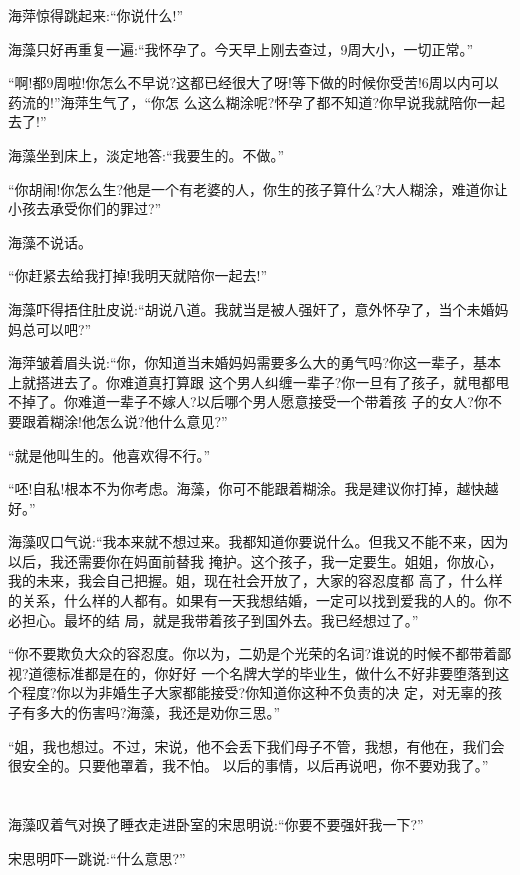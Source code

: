 \documentclass[11pt,a4paper,onecolumn]{article}
\begin{document}
海萍惊得跳起来:``你说什么!''

海藻只好再重复一遍:``我怀孕了。今天早上刚去查过，9周大小，一切正常。''

``啊!都9周啦!你怎么不早说?这都已经很大了呀!等下做的时候你受苦!6周以内可以药流的!''海萍生气了，``你怎
么这么糊涂呢?怀孕了都不知道?你早说我就陪你一起去了!''

海藻坐到床上，淡定地答:``我要生的。不做。''

``你胡闹!你怎么生?他是一个有老婆的人，你生的孩子算什么?大人糊涂，难道你让小孩去承受你们的罪过?''

海藻不说话。

``你赶紧去给我打掉!我明天就陪你一起去!''

海藻吓得捂住肚皮说:``胡说八道。我就当是被人强奸了，意外怀孕了，当个未婚妈妈总可以吧?''

海萍皱着眉头说:``你，你知道当未婚妈妈需要多么大的勇气吗?你这一辈子，基本上就搭进去了。你难道真打算跟
这个男人纠缠一辈子?你一旦有了孩子，就甩都甩不掉了。你难道一辈子不嫁人?以后哪个男人愿意接受一个带着孩
子的女人?你不要跟着糊涂!他怎么说?他什么意见?''

``就是他叫生的。他喜欢得不行。''

``呸!自私!根本不为你考虑。海藻，你可不能跟着糊涂。我是建议你打掉，越快越好。''

海藻叹口气说:``我本来就不想过来。我都知道你要说什么。但我又不能不来，因为以后，我还需要你在妈面前替我
掩护。这个孩子，我一定要生。姐姐，你放心，我的未来，我会自己把握。姐，现在社会开放了，大家的容忍度都
高了，什么样的关系，什么样的人都有。如果有一天我想结婚，一定可以找到爱我的人的。你不必担心。最坏的结
局，就是我带着孩子到国外去。我已经想过了。''

``你不要欺负大众的容忍度。你以为，二奶是个光荣的名词?谁说的时候不都带着鄙视?道德标准都是在的，你好好
一个名牌大学的毕业生，做什么不好非要堕落到这个程度?你以为非婚生子大家都能接受?你知道你这种不负责的决
定，对无辜的孩子有多大的伤害吗?海藻，我还是劝你三思。''

``姐，我也想过。不过，宋说，他不会丢下我们母子不管，我想，有他在，我们会很安全的。只要他罩着，我不怕。
以后的事情，以后再说吧，你不要劝我了。''

\section[\thesection]{}

海藻叹着气对换了睡衣走进卧室的宋思明说:``你要不要强奸我一下?''

宋思明吓一跳说:``什么意思?''
\end{document}

